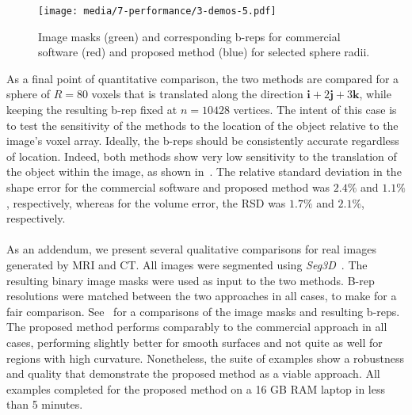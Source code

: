 \begin{figure}[ht!]
	\centering
	\texttt{[image: media/7-performance/3-demos-5.pdf]}
	\caption{Image masks (green) and corresponding b-reps for commercial software (red) and proposed method (blue) for selected sphere radii.}
	\label{fig:demos2}
\end{figure}
%
As a final point of quantitative comparison, the two methods are compared for a sphere of $R = 80$ voxels that is translated along the direction $\bm{i}  + 2\bm{j} + 3\bm{k}$, while keeping the resulting b-rep fixed at $n = 10428$ vertices. The intent of this case is to test the sensitivity of the methods to the location of the object relative to the image's voxel array. Ideally, the b-reps should be consistently accurate regardless of location.  Indeed, both methods show very low sensitivity to the translation of the object within the image, as shown in~. The relative standard deviation in the shape error for the commercial software and proposed method was $2.4\%$ and $1.1\%$, respectively, whereas for the volume error, the RSD was $1.7\%$ and $2.1\%$, respectively. \\ \\
%
As an addendum, we present several qualitative comparisons for real images generated by MRI and CT.  All images were segmented using \textit{Seg3D}~\cite{Seg3D}. The resulting binary image masks were used as input to the two methods. B-rep resolutions were matched between the two approaches in all cases, to make for a fair comparison. See~ for a comparisons of the image masks and resulting b-reps. The proposed method performs comparably to the commercial approach in all cases, performing slightly better for smooth surfaces and not quite as well for regions with high curvature. Nonetheless, the suite of examples show a robustness and quality that demonstrate the proposed method as a viable approach. All examples completed for the proposed method on a 16 GB RAM laptop in less than 5 minutes.
